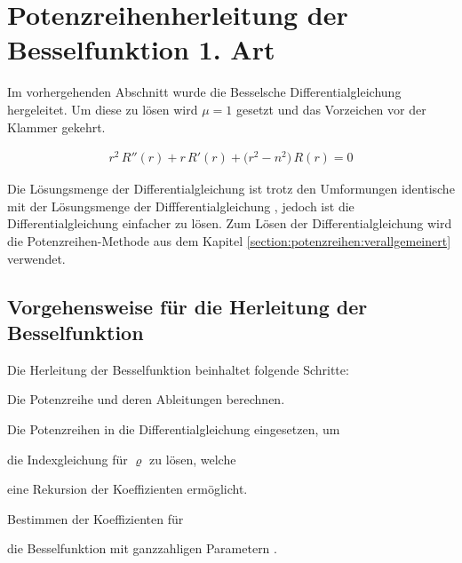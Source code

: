 \section[Potenzreihenherleitung der Besselfunktion]{Potenzreihenherleitung der Besselfunktion 1. Art}
\begin{normalsize}
Im vorhergehenden Abschnitt wurde die Besselsche Differentialgleichung  hergeleitet.
Um diese zu l\"osen wird $\mu = 1$ gesetzt und das Vorzeichen vor der Klammer gekehrt.
\end{normalsize}
\begin{align}
	r^2 \, R'' \left( r \right)
	+
	r \, R' \left( r \right)
	+
	\big( r^2 - n^2 \big) \, R \left( r \right)
	=
	0
	\label{eq:bessel:dgl}
\end{align}
\begin{normalsize}%
Die L\"osungsmenge der Differentialgleichung  ist trotz den Umformungen identische mit der L\"osungsmenge der Diffferentialgleichung , jedoch ist die Differentialgleichung  einfacher zu l\"osen.
Zum L\"osen der Differentialgleichung  wird die Potenzreihen-Methode aus dem Kapitel \ref{section:potenzreihen:verallgemeinert} verwendet.
\end{normalsize}
\subsection{Vorgehensweise f\"ur die Herleitung der Besselfunktion}
\begin{normalsize}%
Die Herleitung der Besselfunktion beinhaltet folgende Schritte:
\end{normalsize}
\begin{compactenum}
	\item Die Potenzreihe und deren Ableitungen berechnen.
	\item Die Potenzreihen in die Differentialgleichung  eingesetzen, um
	\item die Indexgleichung f\"ur $\varrho$ zu l\"osen, welche
	\item eine Rekursion der Koeffizienten erm\"oglicht.
	\item Bestimmen der Koeffizienten f\"ur
	\item die Besselfunktion mit ganzzahligen Parametern .
\end{compactenum}
\setcounter{stepCounter}{1}
